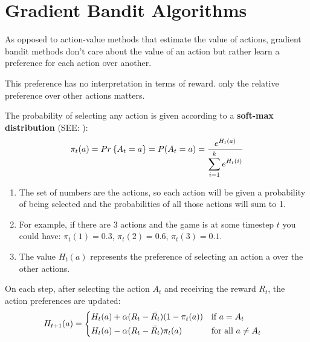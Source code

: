 \section{Gradient Bandit Algorithms \cite{medium-numsmt2-rl-ch2-part-5}}\label{MAB: Gradient Bandit Algorithms}

As opposed to action-value methods that estimate the value of actions, gradient bandit methods don’t care about the value of an action but rather learn a preference for each action over another.

This preference has no interpretation in terms of reward. only the relative preference over other actions matters.

The probability of selecting any action is given according to a \textbf{soft-max distribution} (SEE: ):
\[
    \pi_t(a) = Pr\left\{A_t = a\right\} = P(A_t=a) = \displaystyle\dfrac{e^{H_t(a)}}{\displaystyle\sum_{i=1}^{k} e^{H_t(i)}}
\]

\begin{enumerate}
    \item The set of numbers are the actions, so each action will be given a probability of being selected and the probabilities of all those actions will sum to 1.
    \item For example, if there are 3 actions and the game is at some timestep $t$ you could have: $\pi_t(1) = 0.3$, $\pi_t(2) = 0.6$, $\pi_t(3) = 0.1$.
    \item The value $H_t(a)$ represents the preference of selecting an action a over the other actions.
\end{enumerate}

\vspace{0.2cm}

On each step, after selecting the action $A_t$ and receiving the reward $R_t$, the action preferences are updated:
\[
\begin{aligned}
    H_{t+1}(a) &= 
    \begin{dcases}
        H_t(a) + \alpha(R_t - \bar{R_t})(1-\pi_t(a)) & \text{if } a = A_t \\
        H_t(a) - \alpha(R_t - \bar{R_t})\pi_t(a) & \text{for all } a \neq A_t
    \end{dcases}
\end{aligned}
\]

